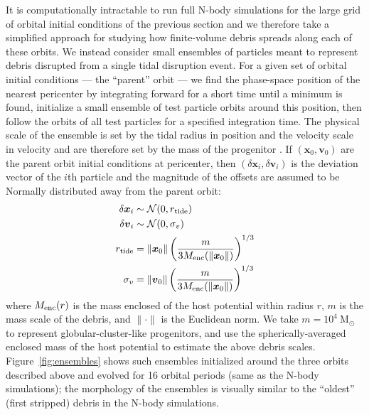 \documentclass[letterpaper,12pt,preprint]{aastex}
\newcommand{\msun}{\ensuremath{\mathrm{M}_\odot}}
\newcommand{\bs}[1]{\boldsymbol{#1}}
\begin{document}
It is computationally intractable to run full N-body simulations for the large grid of orbital initial conditions of the previous section and we therefore take a simplified approach for studying how finite-volume debris spreads along each of these orbits. We instead consider small ensembles of particles meant to represent debris disrupted from a single tidal disruption event. For a given set of orbital initial conditions --- the ``parent'' orbit --- we find the phase-space position of the nearest pericenter by integrating forward for a short time until a minimum is found, initialize a small ensemble of test particle orbits around this position, then follow the orbits of all test particles for a specified integration time. The physical scale of the ensemble is set by the tidal radius in position and the velocity scale in velocity and are therefore set by the mass of the progenitor \citep[e.g.,][]{johnston98, apw14}. If $(\bs{x}_0,\bs{v}_0)$ are the parent orbit initial conditions at pericenter, then $(\delta\bs{x}_i,\delta\bs{v}_i)$ is the deviation vector of the $i$th particle and the magnitude of the offsets are assumed to be Normally distributed away from the parent orbit:
\begin{align}
	\delta\bs{x}_i &\sim \mathcal{N}(0, r_{\rm tide})\\
	\delta\bs{v}_i &\sim \mathcal{N}(0, \sigma_v)\\
	r_{\rm tide} &= \|\bs{x}_0\| \left(\frac{m}{3M_{\rm enc}(\|\bs{x}_0\|)}\right)^{1/3} \\
	\sigma_v &= \|\bs{v}_0\|\left(\frac{m}{3M_{\rm enc}(\|\bs{x}_0\|)}\right)^{1/3} 
\end{align}
where $M_{\rm enc}(r)$ is the mass enclosed of the host potential within radius $r$, $m$ is the mass scale of the debris, and $\|\cdot \|$ is the Euclidean norm. We take $m=10^4~\msun$ to represent globular-cluster-like progenitors, and use the spherically-averaged enclosed mass of the host potential to estimate the above debris scales. Figure~\ref{fig:ensembles} shows such ensembles initialized around the three orbits described above and evolved for 16 orbital periods (same as the N-body simulations); the morphology of the ensembles is visually similar to the ``oldest'' (first stripped) debris in the N-body simulations.
\end{document}
